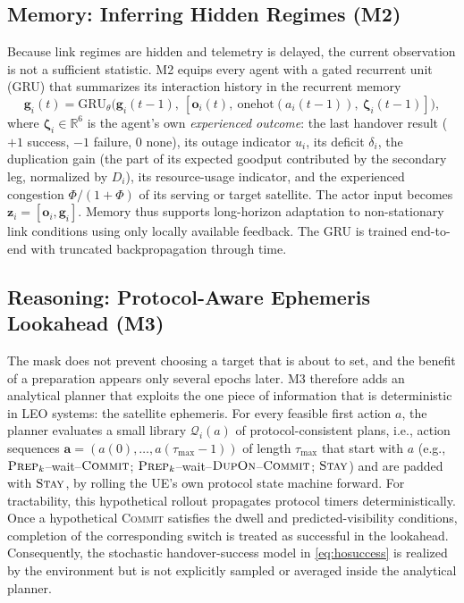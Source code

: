 \documentclass[journal]{IEEEtran}
\begin{document}
\subsection{Memory: Inferring Hidden Regimes (M2)}

Because link regimes are hidden and telemetry is delayed, the current
observation is not a sufficient statistic. M2 equips every agent with a gated
recurrent unit (GRU) that summarizes its interaction history in the recurrent
memory
\begin{equation}
\mathbf{g}_i(t)=\mathrm{GRU}_\theta\big(\mathbf{g}_i(t-1),\ [\mathbf{o}_i(t),\ \mathrm{onehot}(a_i(t-1)),\ \boldsymbol\zeta_i(t-1)]\big),
\end{equation}
where $\boldsymbol\zeta_i\in\mathbb{R}^6$ is the agent's own \emph{experienced
outcome}: the last handover result ($+1$ success, $-1$ failure, $0$ none), its
outage indicator $u_i$, its deficit $\delta_i$, the duplication gain (the part
of its expected goodput contributed by the secondary leg, normalized by
$D_i$), its resource-usage indicator, and the experienced congestion
$\Phi/(1+\Phi)$ of its serving or target satellite. The actor input becomes
$\mathbf{z}_i=[\mathbf{o}_i,\mathbf{g}_i]$. Memory thus supports long-horizon
adaptation to non-stationary link conditions using only locally available
feedback. The GRU is trained end-to-end with truncated backpropagation through
time.

\subsection{Reasoning: Protocol-Aware Ephemeris Lookahead (M3)}

The mask does not prevent choosing a target that is about to set, and the
benefit of a preparation appears only several epochs later. M3 therefore adds
an analytical planner that exploits the one piece of information that is
deterministic in LEO systems: the satellite ephemeris. For every feasible
first action $a$, the planner evaluates a small library $\mathcal{Q}_i(a)$ of
protocol-consistent plans, i.e., action sequences
$\mathbf{a}=(a(0),\dots,a(\tau_{\max}-1))$ of length $\tau_{\max}$ that start
with $a$ (e.g., $\textsc{Prep}_k$--wait--$\textsc{Commit}$;
$\textsc{Prep}_k$--wait--$\textsc{DupOn}$--$\textsc{Commit}$; $\textsc{Stay}$)
and are padded with $\textsc{Stay}$, by rolling the UE's own protocol state
machine forward. For tractability, this hypothetical rollout propagates
protocol timers deterministically. Once a hypothetical \textsc{Commit}
satisfies the dwell and predicted-visibility conditions, completion of the
corresponding switch is treated as successful in the lookahead. Consequently,
the stochastic handover-success model in \eqref{eq:hosuccess} is realized by
the environment but is not explicitly sampled or averaged inside the
analytical planner.
\end{document}

